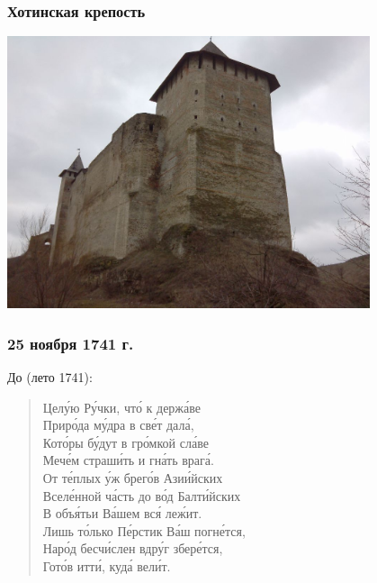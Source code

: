 \documentclass{beamer}
\begin{document}

\begin{frame}
\frametitle{Хотинская крепость}
\begin{center}
\includegraphics[width=0.8\textwidth]{Xotin.jpg}
\end{center}

\end{frame}



\begin{frame}
\frametitle{25 ноября 1741 г.}
До (лето 1741):

\begin{verse}
Цел\'{у}ю Р\'{у}чки, чт\'{о} к держ\'{а}ве\\
Прир\'{о}да м\'{у}дра в св\'{е}т дал\'{а},\\
Кот\'{о}ры б\'{у}дут в гр\'{о}мкой сл\'{а}ве\\
Меч\'{е}м страш\'{и}ть и гн\'{а}ть враг\'{а}.\\
От т\'{е}плых \'{у}ж брег\'{о}в Ази\'{и}йских\\
Всел\'{е}нной ч\'{а}сть до в\'{о}д Балт\'{и}йских\\
В объ\'{я}тьи В\'{а}шем вс\'{я} ле\'{ж}ит.\\
Лишь т\'{о}лько П\'{е}рстик В\'{а}ш погн\'{е}тся,\\
Нар\'{о}д бесч\'{и}слен вдр\'{у}г збер\'{е}тся,\\
Гот\'{о}в итт\'{и}, куд\'{а} вел\'{и}т.
\end{verse}
\end{frame}
\end{document}
